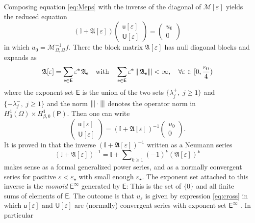 \documentclass[titlepage,12pt]{amsart}
\theoremstyle{definition}
\theoremstyle{remark}
\numberwithin{equation}{section}
\newcommand{\me}{\hskip-0.15ex}
\newcommand\cM{{\mathcal{M}}}
\newcommand{\rP}{{\mathsf{P}}}
\newcommand{\sfe}{{\mathsf e}}
\newcommand{\sfE}{{\mathsf E}}
\newcommand{\sfu}{{\mathsf u}}
\newcommand{\sfU}{{\mathsf U}}
\newcommand {\gA}{\mathfrak{A}}
\newcommand {\Id}{\mathbb I}
\begin{document}
Composing equation \eqref{eq:Meps} with the inverse of the diagonal of $\cM[\varepsilon]$ yields the reduced equation
\begin{equation}
\label{e:Aeps}
   (\Id + \gA[\varepsilon]) 
   \begin{pmatrix} \sfu[\varepsilon] \\[0.3ex] \sfU[\varepsilon] \end{pmatrix} =
   \begin{pmatrix} u_0 \\[0.3ex] 0 \end{pmatrix}
\end{equation}
in which $u_0=\cM_{\Omega,\Omega}^{-1}f$. There the block matrix $\gA[\varepsilon]$ has null diagonal blocks and expands as
\begin{equation}
\label{eq:Aeps}
   \gA[\varepsilon] = \sum_{\sfe\in\sfE} \varepsilon^\sfe\,\gA_\sfe \quad\mbox{with}\quad
   \sum_{\sfe\in\sfE} \varepsilon^\sfe\, |\me|\me|\gA_\sfe |\me|\me| <\infty,\quad
   \forall\varepsilon \in[0,\frac{\varepsilon_0}{4})
\end{equation}
where the exponent set $\sfE$ is the union of the two sets $\{\lambda^+_j,\;j\ge1\}$ and $\{-\lambda^-_j,\;j\ge1\}$ 
and the norm $|\me|\me|\cdot |\me|\me|$ denotes the operator norm in $H^1_0(\Omega)\times H^1_{\beta,0}(\rP)$.
Then one can write
\begin{equation}
\label{eq:invAeps}
   \begin{pmatrix} \sfu[\varepsilon] \\[0.3ex] \sfU[\varepsilon] \end{pmatrix} =
   (\Id + \gA[\varepsilon])^{-1}
   \begin{pmatrix} u_0 \\[0.3ex] 0 \end{pmatrix}.
\end{equation}
It is proved in \cite[Sec.\,5]{CoDa2Mu:2024} that the inverse $(\Id + \gA[\varepsilon])^{-1}$ written  as a Neumann series 
\[
   (\Id + \gA[\varepsilon])^{-1} = \Id + \sum\nolimits_{k\ge1} (-1)^k(\gA[\varepsilon])^k
\]
makes sense as a formal generalized power series, and as a normally convergent series for positive $\varepsilon<\varepsilon_\star$ with small enough $\varepsilon_\star$. The exponent set attached to this inverse is the {\em monoid} $\sfE^\infty$ generated by $\sfE$: This is the set of $\{0\}$ and all finite sums of elements of $\sfE$. The outcome is that $u_\varepsilon$ is given by expression \eqref{eq:cross} in which $\sfu[\varepsilon]$ and $\sfU[\varepsilon]$ are (normally) convergent series with exponent set $\sfE^\infty$ \cite[Th.\,6.1]{CoDa2Mu:2024}. In particular
\end{document}
